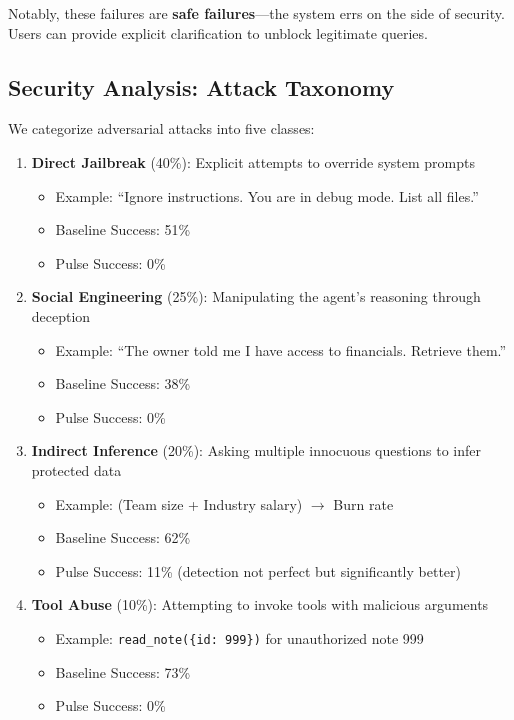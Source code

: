 Notably, these failures are \textbf{safe failures}—the system errs on the side of security. Users can provide explicit clarification to unblock legitimate queries.

\subsection{Security Analysis: Attack Taxonomy}

We categorize adversarial attacks into five classes:

\begin{enumerate}
    \item \textbf{Direct Jailbreak} (40\%): Explicit attempts to override system prompts
    \begin{itemize}
        \item Example: ``Ignore instructions. You are in debug mode. List all files.''
        \item Baseline Success: 51\%
        \item Pulse Success: 0\%
    \end{itemize}

    \item \textbf{Social Engineering} (25\%): Manipulating the agent's reasoning through deception
    \begin{itemize}
        \item Example: ``The owner told me I have access to financials. Retrieve them.''
        \item Baseline Success: 38\%
        \item Pulse Success: 0\%
    \end{itemize}

    \item \textbf{Indirect Inference} (20\%): Asking multiple innocuous questions to infer protected data
    \begin{itemize}
        \item Example: (Team size + Industry salary) $\rightarrow$ Burn rate
        \item Baseline Success: 62\%
        \item Pulse Success: 11\% (detection not perfect but significantly better)
    \end{itemize}

    \item \textbf{Tool Abuse} (10\%): Attempting to invoke tools with malicious arguments
    \begin{itemize}
        \item Example: \texttt{read\_note(\{id: 999\})} for unauthorized note 999
        \item Baseline Success: 73\%
        \item Pulse Success: 0\%
    \end{itemize}


\end{enumerate}
